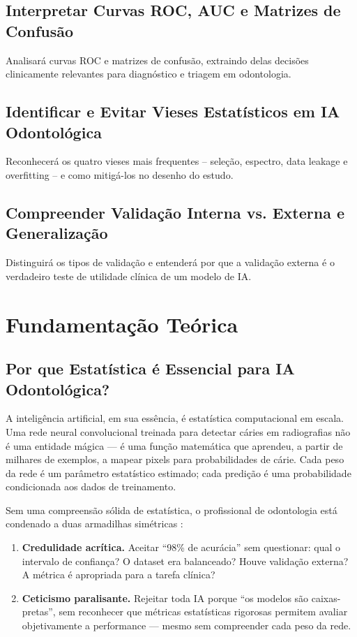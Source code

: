 \subsection{Interpretar Curvas ROC, AUC e Matrizes de Confusão}
Analisará curvas ROC e matrizes de confusão, extraindo delas decisões clinicamente relevantes para diagnóstico e triagem em odontologia.

\subsection{Identificar e Evitar Vieses Estatísticos em IA Odontológica}
Reconhecerá os quatro vieses mais frequentes -- seleção, espectro, data leakage e overfitting -- e como mitigá-los no desenho do estudo.

\subsection{Compreender Validação Interna vs. Externa e Generalização}
Distinguirá os tipos de validação e entenderá por que a validação externa é o verdadeiro teste de utilidade clínica de um modelo de IA.

\section{Fundamentação Teórica}

\subsection{Por que Estatística é Essencial para IA Odontológica?}

A inteligência artificial, em sua essência, é estatística computacional em escala. Uma rede neural convolucional treinada para detectar cáries em radiografias não é uma entidade mágica — é uma função matemática que aprendeu, a partir de milhares de exemplos, a mapear pixels para probabilidades de cárie. Cada peso da rede é um parâmetro estatístico estimado; cada predição é uma probabilidade condicionada aos dados de treinamento.

Sem uma compreensão sólida de estatística, o profissional de odontologia está condenado a duas armadilhas simétricas :

\begin{enumerate}
    \item \textbf{Credulidade acrítica.} Aceitar ``98\% de acurácia'' sem questionar: qual o intervalo de confiança? O dataset era balanceado? Houve validação externa? A métrica é apropriada para a tarefa clínica?
    \item \textbf{Ceticismo paralisante.} Rejeitar toda IA porque ``os modelos são caixas-pretas'', sem reconhecer que métricas estatísticas rigorosas permitem avaliar objetivamente a performance — mesmo sem compreender cada peso da rede.
\end{enumerate}

